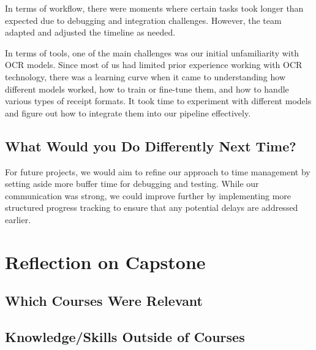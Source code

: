 \documentclass{article}
\begin{document}
In terms of workflow, there were moments where certain tasks took longer than expected due to debugging and integration challenges.
However, the team adapted and adjusted the timeline as needed.

In terms of tools, one of the main challenges was our initial unfamiliarity with OCR models. Since most of us had limited prior experience working with OCR technology,
there was a learning curve when it came to understanding how different models worked, how to train or fine-tune them, and how to handle various types of receipt formats. 
It took time to experiment with different models and figure out how to integrate them into our pipeline effectively.

\subsection{What Would you Do Differently Next Time?}

For future projects, we would aim to refine our approach to time management by setting aside more buffer time for debugging and testing. 
While our communication was strong, we could improve further by implementing more structured progress tracking to ensure that any potential delays are addressed earlier.

\section{Reflection on Capstone}


\subsection{Which Courses Were Relevant}


\subsection{Knowledge/Skills Outside of Courses}

\end{document}
